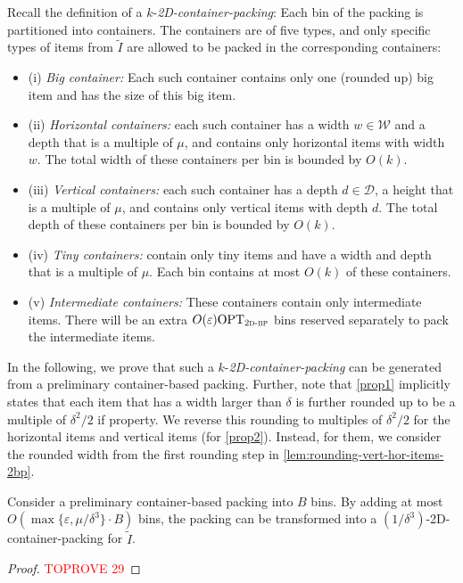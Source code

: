 \documentclass[a4paper,UKenglish,cleveref, autoref, thm-restate]{lipics-v2021}
\newcommand{\eps}{\varepsilon}
\newcommand{\opt}{\mathrm{OPT}}
\newcommand{\twobp}{\textsc{2d-bp}\xspace}
\newcommand{\inter}{intermediate\xspace}
\newcommand{\bigy}{big\xspace}
\newcommand{\tin}{tiny\xspace}
\begin{document}
Recall the definition of a $k$-\emph{2D-container-packing}:
Each bin of the packing is partitioned into containers. 
The containers are of five types, and only specific types of items from $\tilde{I}$ are allowed to be packed in the corresponding containers:
\begin{itemize}
\item (i) {\em Big container:} Each such container contains only one (rounded up) \bigy item and has the size of this \bigy item.  
\item (ii) {\em Horizontal containers:} each such container has a width $w \in \mathcal{W}$ and a depth that is a multiple of $\mu$, and contains only horizontal items with width $w$.  
The total width of these containers per bin is bounded by $O(k)$.
\item (iii) {\em Vertical containers:} 
each such container has a depth $d \in \mathcal{D}$, a height that is a multiple of $\mu$, and contains only vertical items with depth $d$.
The total depth of these containers per bin is bounded by $O(k)$.
\item (iv) {\em Tiny containers:} contain only \tin items and have a width and depth that is a multiple of $\mu$. Each bin contains at most $O(k)$ of these containers.
\item (v) {\em Intermediate containers:} These containers contain only \inter items. There will be an extra $O(\eps)\opt_{\twobp}$ bins reserved separately to pack the \inter items.
\end{itemize}

In the following, we prove that such a $k$-\emph{2D-container-packing} can be generated from a preliminary container-based packing. 
Further, note that \cref{prop1} implicitly states that each item that has a width larger than $\delta$ is further rounded up to be a multiple of $\delta^2/2$ if property. 
We reverse this rounding to multiples of $\delta^2/2$ for the horizontal items and vertical items (for \cref{prop2}). 
Instead, for them, we consider the rounded width from the first rounding step in \cref{lem:rounding-vert-hor-items-2bp}.


\begin{lemma}
Consider a preliminary container-based packing into $B$ bins.
By adding at most ${O}(\max\{\eps,\mu/\delta^3\}\cdot B)$ bins, the packing can be transformed into a $(1/\delta^3)$-2D-container-packing for $\tilde{I}$.
\end{lemma}



\begin{proof}\textcolor{red}{TOPROVE 29}\end{proof}
\end{document}
